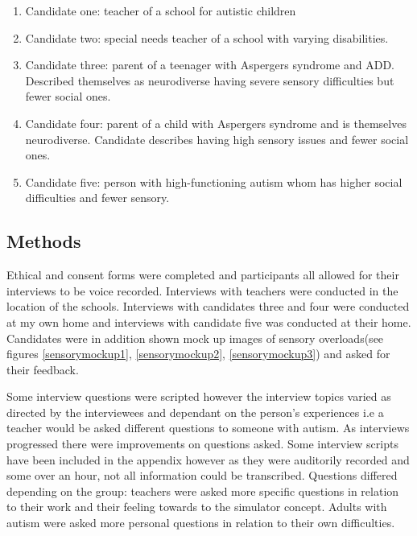\begin{enumerate}
\item Candidate one: teacher of a school for autistic children
\item Candidate two: special needs teacher of a school with varying disabilities.
\item Candidate three: parent of a teenager with Aspergers syndrome and ADD. Described themselves as neurodiverse having severe sensory difficulties but fewer social ones.
\item Candidate four: parent of a child with Aspergers syndrome and is themselves neurodiverse. Candidate describes having high sensory issues and fewer social ones.
\item Candidate five: person with high-functioning autism whom has higher social difficulties and fewer sensory.
\end{enumerate}


\subsection{Methods}
Ethical and consent forms were completed and participants all allowed for their interviews to be voice recorded. Interviews with teachers were conducted in the location of the schools. Interviews with candidates three and four were conducted at my own home and interviews with candidate five was conducted at their home. Candidates were in addition shown mock up images of sensory overloads(see figures \ref{sensorymockup1}, \ref{sensorymockup2}, \ref{sensorymockup3}) and asked for their feedback. 

Some interview questions were scripted however the interview topics varied as directed by the interviewees and dependant on the person's experiences i.e a teacher would be asked different questions to someone with autism. As interviews progressed there were improvements on questions asked. Some interview scripts have been included in the appendix however as they were auditorily recorded and some over an hour, not all information could be transcribed. Questions differed depending on the group: teachers were asked more specific questions in relation to their work and their feeling towards to the simulator concept. Adults with autism were asked more personal questions in relation to their own difficulties. 

